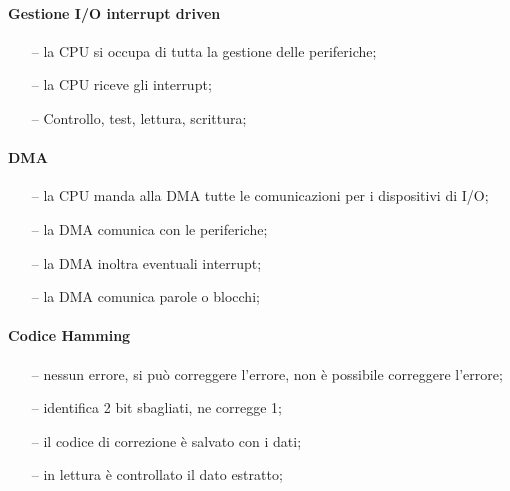 \documentclass{article}
\begin{document}
\paragraph{Gestione I/O interrupt driven}
\begin{itemize}
	\item[--] la CPU si occupa di tutta la gestione delle periferiche;
	\item[--] la CPU riceve gli interrupt;
	\item[--] Controllo, test, lettura, scrittura;
\end{itemize}

\paragraph{DMA}
\begin{itemize}
	\item[--] la CPU manda alla DMA tutte le comunicazioni per i dispositivi di I/O;
	\item[--] la DMA comunica con le periferiche;
	\item[--] la DMA inoltra eventuali interrupt;
	\item[--] la DMA comunica parole o blocchi;
\end{itemize}

\paragraph{Codice Hamming}
\begin{itemize}
	\item[--] nessun errore, si può correggere l'errore, non è possibile correggere l'errore;
	\item[--] identifica 2 bit sbagliati, ne corregge 1;
	\item[--] il codice di correzione è salvato con i dati;
	\item[--] in lettura è controllato il dato estratto;
\end{itemize}
\end{document}

